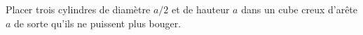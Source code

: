 Placer trois cylindres de diamètre $a/2$ et de hauteur $a$ dans un cube creux d'arête $a$ de sorte qu'ils ne puissent plus bouger.
